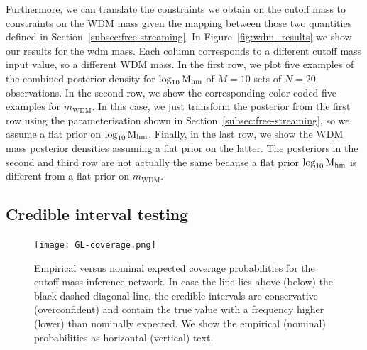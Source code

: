 Furthermore, we can translate the constraints we obtain on the cutoff mass to constraints on the WDM mass given the mapping between those two quantities defined in Section~\ref{subsec:free-streaming}. In Figure~\ref{fig:wdm_results} we show  our results for the \gls*{wdm} mass. Each column corresponds to a different cutoff mass input value, so a different WDM mass. In the first row, we plot five examples of the combined posterior density for $\log_{10}\mathrm{M_{hm}}$ of $M=10$ sets of $N=20$ observations. In the second row, we show the corresponding color-coded five examples for $m_{\mathrm{WDM}}$. In this case, we just transform the posterior from the first row using the parameterisation shown in Section~\ref{subsec:free-streaming}, so we assume a flat prior on $\log_{10}\mathrm{M_{hm}}$. Finally, in the last row, we show the WDM mass posterior densities assuming a flat prior on the latter. The posteriors in the second and third row are not actually the same because a flat prior $\log_{10}\mathrm{M_{hm}}$ is different from a flat prior on $m_{\mathrm{WDM}}$.

\subsection{Credible interval testing}
\label{subsec:test}

\begin{figure}
    \centering
    \texttt{[image: GL-coverage.png]}
    \caption{Empirical versus nominal expected coverage probabilities for the cutoff mass inference network. In case the line lies above (below) the black dashed diagonal line, the credible intervals are conservative (overconfident) and contain the true value with a frequency higher (lower) than nominally expected. We show the empirical (nominal) probabilities as horizontal (vertical) text.
}
\label{fig:coverage}
\end{figure}

